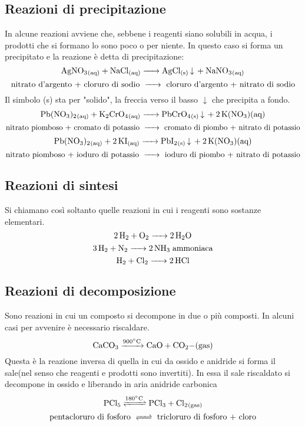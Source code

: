 \subsection{Reazioni di precipitazione}
In alcune reazioni avviene che, sebbene i reagenti siano solubili in acqua, i prodotti che si formano lo sono poco o per niente. In questo caso si forma un precipitato e la reazione è detta di precipitazione:
$$\ce{ AgNO_3_{(aq)} + NaCl_{(aq)} -> AgCl_{(s)} v  + NaNO_3_{(aq)} }$$
$$\text{nitrato d'argento + cloruro di sodio \ce{->} cloruro d'argento + nitrato di sodio}$$
Il simbolo (s) sta per "solido", la freccia verso il basso $\downarrow$ che precipita a fondo.
$$\ce{Pb(NO_3)_2_{(aq)} + K_2CrO_4_{(aq)} ->  PbCrO_4_{(s)} v + 2 K(NO_3){(aq)}}$$
$$\text{nitrato piomboso + cromato di potassio \ce{->} cromato di piombo + nitrato di potassio}$$
$$\ce{Pb(NO_3)_2_{(aq)} + 2 KI_{(aq)} ->  PbI_2_{(s)} v + 2 K(NO_3){(aq)}}$$
$$\text{nitrato piomboso + ioduro di potassio \ce{->} ioduro di piombo + nitrato di potassio}$$
\subsection{Reazioni di sintesi}
Si chiamano così soltanto quelle reazioni in cui i reagenti sono sostanze elementari.
$$\ce{2 H_2 + O_2 -> 2 H_2O}$$
$$\ce{3 H_2 + N_2 -> 2 NH_3} \; \text{ammoniaca}$$
$$\ce{H_2 + Cl_2 -> 2 HCl}$$
\subsection{Reazioni di decomposizione}
Sono reazioni in cui un composto si decompone in due o più composti. In alcuni casi per avvenire è necessario riscaldare.
$$\ce{CaCO_3 ->[{900^{\circ}C}] CaO + CO_2-{(gas)} }$$
Questa è la reazione inversa di quella in cui da ossido e anidride si forma il sale(nel senso che reagenti e prodotti sono invertiti). In essa il sale riscaldato si decompone in ossido e liberando in aria anidride carbonica 
$$\ce{PCl_5 <=>[{180^{\circ}C}] PCl_3 + Cl_2_{(gas)}}$$
$$\text{pentacloruro di fosforo \ce{<=>} tricloruro di fosforo + cloro}$$